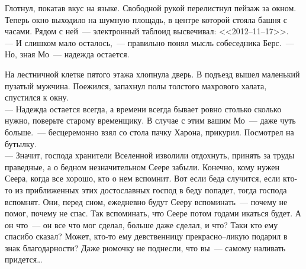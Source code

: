 Глотнул, покатав вкус на языке. Свободной рукой перелистнул пейзаж за окном. 
Теперь окно выходило на шумную площадь, в центре которой стояла башня с часами. 
Рядом с ней~--- электронный таблоид высвечивал: <<2012--11--17>>.\\
--- И слишком мало осталось,~--- правильно понял мысль собеседника Берс.~--- Но, 
зная Мо~--- надежда остается.

На лестничной клетке пятого этажа хлопнула дверь. В подъезд вышел маленький 
пузатый мужчина. Поежился, запахнул полы толстого махрового халата, спустился к 
окну.\\
--- Надежда остается всегда, а времени всегда бывает ровно столько сколько нужно, 
поверьте старому временщику. В случае с этим вашим Мо~--- даже чуть больше.~--- 
бесцеремонно взял со стола пачку Харона, прикурил. Посмотрел на бутылку.\\
--- Значит, господа хранители Вселенной изволили отдохнуть, принять за труды 
праведные, а о бедном незначительном Сеере забыли. Конечно, кому нужен Сеера, 
когда все хорошо, кто о нем вспомнит. Вот если беда случится, если кто-то из 
приближенных этих достославных господ в беду попадет, тогда господа вспомнят. 
Они, перед сном, ежедневно будут Сееру вспоминать~--- почему не помог, почему 
не спас. Так вспоминать, что Сеере потом годами икаться будет. А он что~--- он все 
что мог сделал, больше даже сделал, и что? Таки кто ему спасибо сказал? Может, 
кто-то ему девственницу прекрасно--ликую подарил в знак благодарности? Даже 
рюмочку не поднесли, что вы~--- самому наливать придется\ldots

